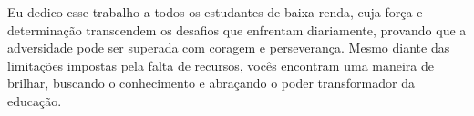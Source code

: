 \newpage
    \begin{dedicatoria}
       \vspace*{\fill}
       \centering
       \hspace{.9\textwidth}
            \begin{minipage}{.6\textwidth}
            \setlength{\parskip}{0.5cm}	
            \fonteDedicatoria 
            \begin{itshape}
            	Eu dedico esse trabalho a todos os estudantes de baixa renda, cuja força e determinação transcendem os desafios que enfrentam diariamente, provando que a adversidade pode ser superada com coragem e perseverança. Mesmo diante das limitações impostas pela falta de recursos, vocês encontram uma maneira de brilhar, buscando o conhecimento e abraçando o poder transformador da educação.        
            \end{itshape}
            \end{minipage}
        \vspace*{\fill}
    \end{dedicatoria}